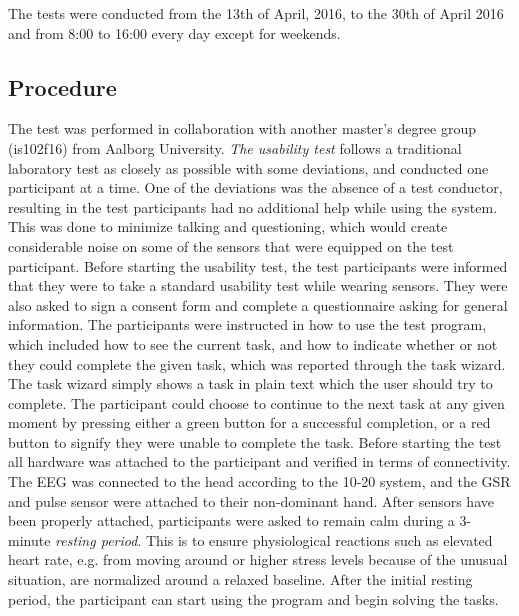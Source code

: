 The tests were conducted from the 13th of April, 2016, to the 30th of April 2016 and from 8:00 to 16:00 every day except for weekends. 

\subsection{Procedure}
The test was performed in collaboration with another master's degree group (is102f16) from Aalborg University.
\textit{The usability test} follows a traditional laboratory test as closely as possible with some deviations, and conducted one participant at a time. 
One of the deviations was the absence of a test conductor, resulting in the test participants had no additional help while using the system. 
This was done to minimize talking and questioning, which would create considerable noise on some of the sensors that were equipped on the test participant.
Before starting the usability test, the test participants were informed that they were to take a standard usability test while wearing sensors.
They were also asked to sign a consent form and complete a questionnaire asking for general information.  
The participants were instructed in how to use the test program, which included how to see the current task, and how to indicate whether or not they could complete the given task, which was reported through the task wizard. 
The task wizard simply shows a task in plain text which the user should try to complete. The participant could choose to continue to the next task at any given moment by pressing either a green button for a successful completion, or a red button to signify they were unable to complete the task. 
Before starting the test all hardware was attached to the participant and verified in terms of connectivity. 
The EEG was connected to the head according to the 10-20 system\cite{eeg_tech_10_20}, and the GSR and pulse sensor were attached to their non-dominant hand.
After sensors have been properly attached, participants were asked to remain calm during a 3-minute \textit{resting period}. 
This is to ensure physiological reactions such as elevated heart rate, e.g. from moving around or higher stress levels because of the unusual situation, are normalized around a relaxed baseline. 
After the initial resting period, the participant can start using the program and begin solving the tasks. 

